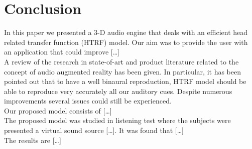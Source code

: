 \documentclass[journal]{IEEEtran}
\begin{document}
%
%







\section{Conclusion}


In this paper we presented a 3-D audio engine that deals with an efficient head related transfer function (HTRF) model. Our aim was to provide the user with an application that could improve […] \\
A review of the research in state-of-art and product literature related to the concept of audio augmented reality has been given. In particular, it has been pointed out that to have a well binaural reproduction, HTRF model should be able to reproduce very accurately all our auditory cues. Despite numerous improvements several issues could still be experienced. \\
Our proposed model consists of […] \\
The proposed model was studied in listening test where the subjects were presented a virtual sound source […]. It was found that […] \\
The results are […]
\end{document}
